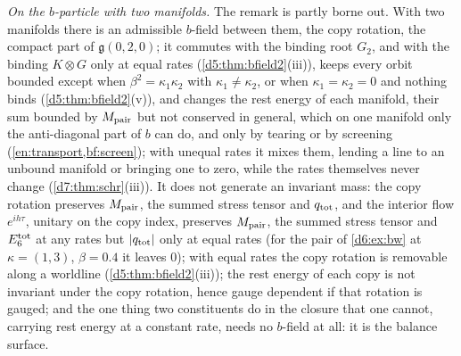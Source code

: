 \emph{On the $b$-particle with two manifolds.} The remark is partly borne out. With two manifolds there is an admissible $b$-field between
them, the copy rotation, the compact part of $\mathfrak g(0,2,0)$; it commutes with the binding root $G_2$, and with the binding $K\otimes G$ only at equal rates (\cref{d5:thm:bfield2}(iii)), keeps every orbit bounded except when
$\beta^2=\kappa_1\kappa_2$ with $\kappa_1\neq\kappa_2$, or when $\kappa_1=\kappa_2=0$ and nothing binds (\cref{d5:thm:bfield2}(v)), and changes the rest energy of each manifold, their sum bounded by $M_{\rm pair}$ but not conserved in general, which on one manifold only the anti-diagonal part of $b$
can do, and only by tearing or by screening (\cref{en:transport,bf:screen}); with unequal rates it mixes them, lending a line to an unbound
manifold or bringing one to zero, while the rates themselves never change (\cref{d7:thm:schr}(iii)). It does not generate an invariant mass: the copy rotation preserves $M_{\rm pair}$, the summed stress tensor and $q_{\rm tot}$, and the
interior flow $e^{ih\tau}$, unitary on the copy index, preserves $M_{\rm pair}$, the summed stress tensor and $E_6^{\rm tot}$ at any rates but
$|q_{\rm tot}|$ only at equal rates (for the pair of \cref{d6:ex:bw} at $\kappa=(1,3)$, $\beta=0.4$ it leaves $0$); with equal rates the copy rotation is removable along a worldline (\cref{d5:thm:bfield2}(iii)); the rest energy of each copy is not invariant under the copy rotation, hence gauge dependent if that rotation is gauged; and the one thing two constituents do in
the closure that one cannot, carrying rest energy at a constant rate, needs no $b$-field at all: it is the balance surface.

